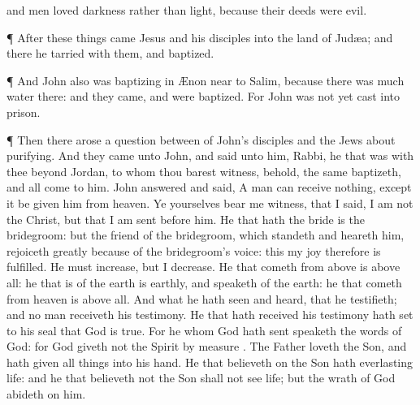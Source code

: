 {{{and
men
loved
darkness
rather
than
light,
because
their
deeds
were
evil.}}
\par }{\PP {}¶
After these
things
came
Jesus
and
his
disciples
into the
land of
Judæa;
and
there he
tarried
with
them,
and
baptized.
\par }{\PP {}¶
And
John
also
was
baptizing
in
Ænon
near to
Salim,
because there
was
much
water
there:
and they
came,
and were
baptized.
For
John
was not
yet
cast
into
prison.
\par }{\PP {}¶
Then there
arose a
question
between
{}
of
John’s
disciples
and the
Jews
about
purifying.
And they
came
unto
John,
and
said unto
him,
Rabbi,
he that
was
with
thee
beyond
Jordan, to
whom
thou barest
witness,
behold, the
same
baptizeth,
and
all
{}
come
to
him.
John
answered
and
said, A
man
can
receive
nothing,
except it
be
given
him
from
heaven.
Ye
yourselves
bear
me
witness,
that I
said,
I
am
not the
Christ,
but
that I
am
sent
before
him.
He that
hath the
bride
is the
bridegroom:
but the
friend of the
bridegroom, which
standeth
and
heareth
him,
rejoiceth
greatly
because of
the
bridegroom’s
voice:
this
my
joy
therefore is
fulfilled.
He
must
increase,
but
I
{}
decrease.
He that
cometh from
above
is
above
all: he that
is
of the
earth
is
earthly,
and
speaketh
of the
earth: he that
cometh
from
heaven
is
above
all.
And
what he hath
seen
and
heard,
that he
testifieth;
and no
man
receiveth
his
testimony.
He that hath
received
his
testimony hath set to his
seal
that
God
is
true.
For he
whom
God hath
sent
speaketh the
words of
God:
for
God
giveth
not the
Spirit
by
measure
{}.
The
Father
loveth the
Son,
and hath
given all
things
into
his
hand.
He that
believeth
on the
Son
hath
everlasting
life:
and he that believeth
not the
Son
shall
not
see
life;
but the
wrath of
God
abideth
on
him.

}
